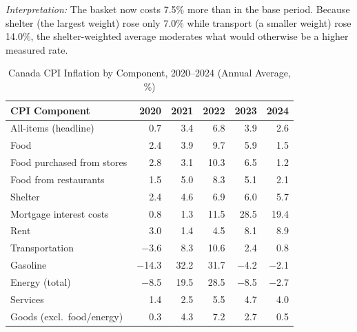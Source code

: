 \noindent\textit{Interpretation:} The basket now costs 7.5\% more than
in the base period. Because shelter (the largest weight) rose only 7.0\%
while transport (a smaller weight) rose 14.0\%, the shelter-weighted
average moderates what would otherwise be a higher measured rate.

\begin{table}[H]
\centering
\caption{Canada CPI Inflation by Component, 2020--2024 (Annual Average, \%)}
\label{tab:cpi_components}
\renewcommand{\arraystretch}{1.30}
\begin{tabular}{lrrrrr}
\toprule
\textbf{CPI Component} & \textbf{2020} & \textbf{2021} & \textbf{2022}
                       & \textbf{2023} & \textbf{2024} \\
\midrule
All-items (headline)  &  0.7 &  3.4 &  6.8 & 3.9 & 2.6 \\
\midrule
Food                  &  2.4 &  3.9 &  9.7 & 5.9 & 1.5 \\
\quad Food purchased from stores & 2.8 & 3.1 & 10.3 & 6.5 & 1.2 \\
\quad Food from restaurants & 1.5 & 5.0 & 8.3 & 5.1 & 2.1 \\
Shelter               &  2.4 &  4.6 &  6.9 & 6.0 & 5.7 \\
\quad Mortgage interest costs & 0.8 & 1.3 & 11.5 & 28.5 & 19.4 \\
\quad Rent             &  3.0 &  1.4 &  4.5 &  8.1 &  8.9 \\
Transportation        & $-$3.6 &  8.3 & 10.6 & 2.4 & 0.8 \\
\quad Gasoline        &$-$14.3 & 32.2 & 31.7 &$-$4.2 &$-$2.1 \\
Energy (total)        & $-$8.5 & 19.5 & 28.5 &$-$8.5 &$-$2.7 \\
Services              &  1.4 &  2.5 &  5.5 & 4.7 & 4.0 \\
Goods (excl.\ food/energy) & 0.3 & 4.3 & 7.2 & 2.7 & 0.5 \\
\bottomrule
\end{tabular}
\end{table}

